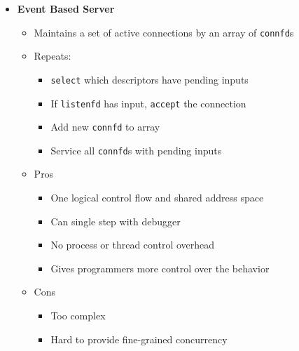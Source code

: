 \documentclass[12pt]{article}
\begin{document}
{\begin{itemize}
\begin{itemize}
		\item \textit{No shared states between clients}
		\item Both parent \& child have copies of \texttt{listenfd} and \texttt{connfd}: parent should close \texttt{connfd}, child should close \texttt{listenfd} (considering \texttt{refcnt})
		\item Pros
		\begin{itemize}
			\item Clean sharing model - file tables (o), descriptors/global var.(x)
			\item Simple and straightforward
		\end{itemize}
		\item Cons
		\begin{itemize}
			\item Additional overhead for process control
			\item Hard to share data between processes (IPC)
		\end{itemize}
	\end{itemize}
	\item \textbf{Event Based Server}
	\begin{itemize}
		\item Maintains a set of active connections by an array of \texttt{connfd}s
		\item Repeats:
		\begin{itemize}
			\item \texttt{select} which descriptors have pending inputs
			\item If \texttt{listenfd} has input, \texttt{accept} the connection
			\item Add new \texttt{connfd} to array
			\item Service all \texttt{connfd}s with pending inputs
		\end{itemize}
		\item Pros
		\begin{itemize}
			\item One logical control flow and shared address space
			\item Can single step with debugger
			\item No process or thread control overhead
			\item Gives programmers more control over the behavior
		\end{itemize}
		\item Cons
		\begin{itemize}
			\item Too complex
			\item Hard to provide fine-grained concurrency

\end{itemize}
\end{itemize}
\end{itemize}}
\end{document}
